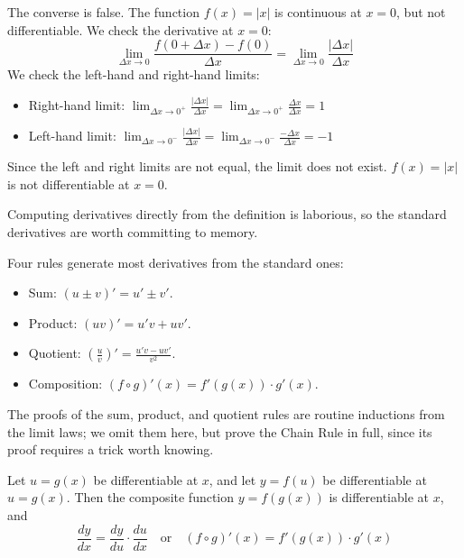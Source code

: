 \begin{example}
The converse is false. The function $f(x) = |x|$ is continuous at $x=0$, but not differentiable.
We check the derivative at $x=0$:
\[
\lim_{\Delta x \to 0} \frac{f(0 + \Delta x) - f(0)}{\Delta x} = \lim_{\Delta x \to 0} \frac{|\Delta x|}{\Delta x}
\]
We check the left-hand and right-hand limits:
\begin{itemize}
    \item Right-hand limit: $\lim_{\Delta x \to 0^+} \frac{|\Delta x|}{\Delta x} = \lim_{\Delta x \to 0^+} \frac{\Delta x}{\Delta x} = 1$
    \item Left-hand limit: $\lim_{\Delta x \to 0^-} \frac{|\Delta x|}{\Delta x} = \lim_{\Delta x \to 0^-} \frac{-\Delta x}{\Delta x} = -1$
\end{itemize}
Since the left and right limits are not equal, the limit does not exist. $f(x) = |x|$ is not differentiable at $x=0$.
\end{example}

Computing derivatives directly from the definition is laborious, so the standard derivatives are worth committing to memory.

Four rules generate most derivatives from the standard ones:
\begin{itemize}
    \item Sum: $(u\pm v)'=u'\pm v'$.
    \item Product: $(uv)'=u'v+uv'$.
    \item Quotient: $(\frac{u}{v})'=\frac{u'v-uv'}{v^2}$.
    \item Composition: $(f\circ g)'(x) = f'(g(x))\cdot g'(x)$.
\end{itemize}

The proofs of the sum, product, and quotient rules are routine inductions from the limit laws; we omit them here, but prove the Chain Rule in full, since its proof requires a trick worth knowing.

\begin{theorem}
Let $u = g(x)$ be differentiable at $x$, and let $y = f(u)$ be differentiable at $u = g(x)$.
Then the composite function $y = f(g(x))$ is differentiable at $x$, and
\[
\frac{dy}{dx} = \frac{dy}{du} \cdot \frac{du}{dx} \quad \text{or} \quad (f \circ g)'(x) = f'(g(x)) \cdot g'(x)
\]
\end{theorem}

